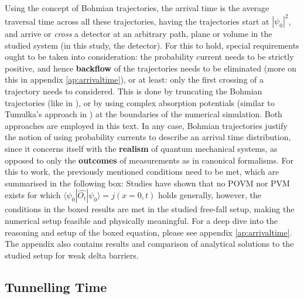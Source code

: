 Using the concept of Bohmian trajectories, the arrival time is the average traversal time across all these trajectories, having the trajectories start at $|\psi_0|^2$, and arrive or \textit{cross} a detector at an arbitrary path, plane or volume in the studied system (in this study, the detector). For this to hold, special requirements ought to be taken into consideration: the probability current needs to be strictly positive, and hence \textbf{backflow} of the trajectories needs to be eliminated (more on this in appendix \ref{ap:arrivaltime}), or at least: only the first crossing of a trajectory needs to considered. This is done by truncating the Bohmian trajectories (like in \cite{DAS2025170054}), or by using complex absorption potentials (similar to  Tumulka's approach in \cite{paper:tumulka}) at the boundaries of the numerical simulation. Both approaches are employed in this text. In any case, Bohmian trajectories justify the notion of using probability currents to describe an arrival time distribution, since it concerns itself with the \textbf{realism} of quantum mechanical systems, as opposed to only the \textbf{outcomes} of measurements as in canonical formalisms. For this to work, the previously mentioned conditions need to be met, which are summarised in the following box:
Studies \cite{MUGA2000353} \cite{Vona_2013} have shown that no POVM nor PVM exists for which $\langle \psi_0 | \hat{O_t} | \psi_0 \rangle = j(x=0, t)$ holds generally, however, the conditions in the boxed results are met in the studied free-fall setup, making the numerical setup feasible and physically meaningful. For a deep dive into the reasoning and setup of the boxed equation, please see appendix \ref{ap:arrivaltime}. The appendix also contains results and comparison of analytical solutions to the studied setup for weak delta barriers.

\subsection{Tunnelling Time}

